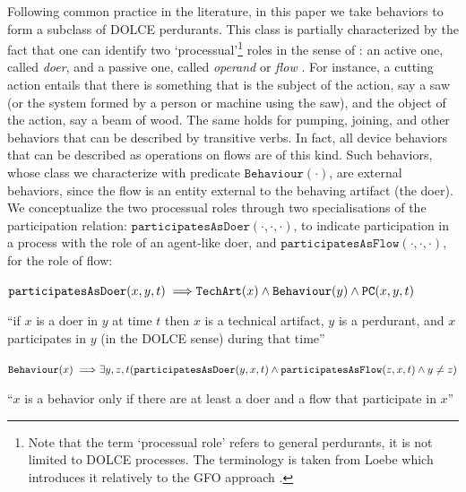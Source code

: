 \documentclass[sw]{iosart2x}
\newcommand{\bflist}{\begin{list}{}{\setlength{\topsep}{2mm}\setlength{\partopsep}{0mm}\setlength{\parsep}{0mm}\setlength{\leftmargin}{9mm}\setlength{\labelwidth}{8mm}}}
\newcommand{\eflist}{\end{list}}
\newcommand{\AxLabel}{\textrm{a}}
\newcounter{cntax}
\newcommand{\myax}[1]{\refstepcounter{cntax}\begin{small}{\bf \AxLabel\thecntax\label{ax:#1}}\end{small}}
\newcommand{\mytext}[1]{``#1''}
\newcommand{\generalStyle}[1]{\texttt{#1}}
\newcommand{\uniRel}[2]{\generalStyle{#1}(#2)}
\newcommand{\triRel}[4]{\generalStyle{#1}(#2,#3,#4)}
\newcommand{\myfi}{\hspace{0.9mm} \Longrightarrow}
\newcommand{\DOLCE}{\textsc{DOLCE}\xspace} %
\newcommand{\DOLCEPC}[3]{\triRel{{PC}}{#1}{#2}{#3}}
\newcommand{\TechArt}[1]{\uniRel{TechArt}{#1}}
\newcommand{\BehaviourConcrete}[1]{\uniRel{Behaviour}{#1}}
\newcommand{\participateAsDoer}[3]{\triRel{participatesAsDoer}{#1}{#2}{#3}}
\newcommand{\participateAsFlow}[3]{\triRel{participatesAsFlow}{#1}{#2}{#3}}
\newcommand{\firstTimeKeyWord}[1]{\textit{#1}}
\newcommand{\quotes}[1]{`#1'}
\newcommand{\TODO}[1]{{%
}}
\newcommand{\TODOinline}[1]{{%
}}
\begin{document}
Following common practice in the literature, in this paper we take behaviors to form a subclass of \DOLCE perdurants. This class is partially characterized by the fact that one can identify two `processual'\footnote{Note that the term \quotes{processual role} refers to general perdurants, it is not limited to \DOLCE processes. The terminology is taken from Loebe which introduces it relatively to the GFO approach \cite{loebeAbstractVsSocial2007}.} roles in the sense of \cite{loebeAbstractVsSocial2007}: an active one, called \firstTimeKeyWord{doer}, and a passive one, called \firstTimeKeyWord{operand} or \firstTimeKeyWord{flow} \cite{pahl_engineering_2007}. 
For instance, a cutting action entails that there is something that is the subject of the action, say a saw (or the system formed by a person or machine using the saw), and the object of the action, say a beam of wood.
The same holds for pumping, joining, and other behaviors that can be described by transitive verbs. 
In fact, all device behaviors that can be described as operations on flows are of this kind. 
Such behaviors, whose class we characterize with predicate $\BehaviourConcrete{\cdot}$, are external behaviors, since the flow is an entity external to the behaving artifact (the doer).
We conceptualize the two processual roles through two specialisations of the participation relation: $\participateAsDoer{\cdot}{\cdot}{\cdot}$, to indicate participation in a process with the role of an agent-like doer, and $\participateAsFlow{\cdot}{\cdot}{\cdot}$, for the role of flow: 
\bflist
  \item[\myax{participateAsDoerRage}]  $ \participateAsDoer{x}{y}{t} \myfi \TechArt{x} \land \BehaviourConcrete{y} \land \DOLCEPC{x}{y}{t}$
\item \mytext{if $x$ is a doer in $y$ at time $t$ then $x$ is a technical artifact, $y$ is a perdurant, and $x$ participates in $y$ (in the \DOLCE sense) during that time}
  \item[\myax{processualRoles}] $ \BehaviourConcrete{x} \myfi \exists y,z,t(\participateAsDoer{y}{x}{t} \land \participateAsFlow{z}{x}{t} \land y \neq z) $ 
\item \mytext{$x$ is a behavior only if there are at least a doer and a flow that participate in $x$}\TODOinline{[SB: se assumiamo che i ruoli sono giocati da entità distinte, come mi sembra implicitamente facciamo, dovremmo aggiungere $y \neq z$[FC: aggiunto]} \eflist
\end{document}
